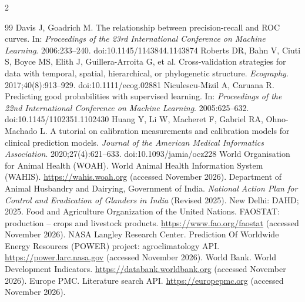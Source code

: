 \documentclass[11pt]{article}
\begin{document}
\begin{multicols}{2}
\begin{thebibliography}{99}
 Davis J, Goadrich M. The relationship between precision-recall and ROC curves. In: \emph{Proceedings of the 23rd International Conference on Machine Learning}. 2006:233--240. doi:10.1145/1143844.1143874
 Roberts DR, Bahn V, Ciuti S, Boyce MS, Elith J, Guillera-Arroita G, et al. Cross-validation strategies for data with temporal, spatial, hierarchical, or phylogenetic structure. \emph{Ecography}. 2017;40(8):913--929. doi:10.1111/ecog.02881
 Niculescu-Mizil A, Caruana R. Predicting good probabilities with supervised learning. In: \emph{Proceedings of the 22nd International Conference on Machine Learning}. 2005:625--632. doi:10.1145/1102351.1102430
 Huang Y, Li W, Macheret F, Gabriel RA, Ohno-Machado L. A tutorial on calibration measurements and calibration models for clinical prediction models. \emph{Journal of the American Medical Informatics Association}. 2020;27(4):621--633. doi:10.1093/jamia/ocz228
 World Organisation for Animal Health (WOAH). World Animal Health Information System (WAHIS). \url{https://wahis.woah.org} (accessed November 2026).
 Department of Animal Husbandry and Dairying, Government of India. \emph{National Action Plan for Control and Eradication of Glanders in India} (Revised 2025). New Delhi: DAHD; 2025.
 Food and Agriculture Organization of the United Nations. FAOSTAT: production -- crops and livestock products. \url{https://www.fao.org/faostat} (accessed November 2026).
 NASA Langley Research Center. Prediction Of Worldwide Energy Resources (POWER) project: agroclimatology API. \url{https://power.larc.nasa.gov} (accessed November 2026).
 World Bank. World Development Indicators. \url{https://databank.worldbank.org} (accessed November 2026).
 Europe PMC. Literature search API. \url{https://europepmc.org} (accessed November 2026).
\end{thebibliography}
\end{multicols}
\end{document}
